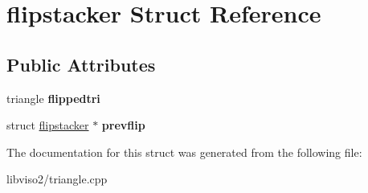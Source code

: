\hypertarget{structflipstacker}{\section{flipstacker Struct Reference}
\label{structflipstacker}
}
\subsection*{Public Attributes}
\begin{DoxyCompactItemize}
\item 
\hypertarget{structflipstacker_af476effffe8e2f8f2af7108d0f18e7c7}{triangle {\bfseries flippedtri}}\label{structflipstacker_af476effffe8e2f8f2af7108d0f18e7c7}

\item 
\hypertarget{structflipstacker_aab8edb201c23d9f1d7955950f341230d}{struct \hyperlink{structflipstacker}{flipstacker} $\ast$ {\bfseries prevflip}}\label{structflipstacker_aab8edb201c23d9f1d7955950f341230d}

\end{DoxyCompactItemize}


The documentation for this struct was generated from the following file\+:\begin{DoxyCompactItemize}
\item 
libviso2/triangle.\+cpp\end{DoxyCompactItemize}
